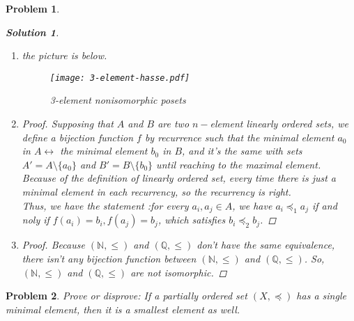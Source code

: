 \documentclass[12pt]{article}
\newtheorem*{solution}{Solution}
\newtheorem{hw}{Problem}
\begin{document}
\begin{hw}
\begin{solution}
    \begin{enumerate}
        \item the picture is below.
        \begin{figure}[htbp]
            \centering
            \texttt{[image: 3-element-hasse.pdf]}
            \caption{3-element nonisomorphic posets}\label{3-element-hasse}
        \end{figure}
        \item \begin{proof}
                  Supposing that $A$ and $B$ are two $n-$element linearly ordered sets, we define a bijection function $f$ by recurrence such that the minimal element $a_0$ in $A \leftrightarrow$ the minimal element $b_0$ in $B$, and it's the same with sets $A'=A\setminus  \{a_0\}$ and $B'=B\setminus \{b_0\}$ until reaching to the maximal element. 
                  Because of the definition of linearly ordered set, every time there is just a minimal element in each recurrency, so the recurrency is right.
                  \\Thus, we have the statement :for every $a_i,a_j\in A$, we have $a_i\preceq_1 a_j$ if and noly if $f(a_i)=b_i,f(a_j)=b_j$, which satisfies $b_i\preceq_2 b_j$.
              \end{proof}
        \item \begin{proof}
                  Because $(\mathbb{N},\leq)$ and $(\mathbb{Q},\leq)$ don't have the same equivalence, there isn't any bijection function between $(\mathbb{N},\leq)$ and $(\mathbb{Q},\leq)$. So, $(\mathbb{N},\leq)$ and $(\mathbb{Q},\leq)$ are not isomorphic.
              \end{proof}
    \end{enumerate}
\end{solution}
\end{hw}


\begin{hw}
Prove or disprove: If a partially ordered set $(X,\preceq)$ has a single minimal element, then it is a smallest element as well.
\end{hw}
\end{document}
